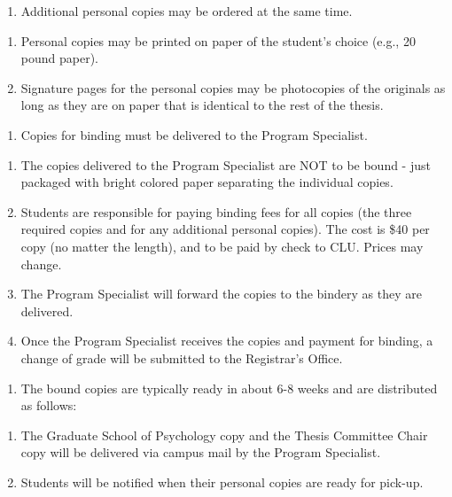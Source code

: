 \documentclass[]{book}
\providecommand{\tightlist}{%
  \setlength{\itemsep}{0pt}\setlength{\parskip}{0pt}}
\begin{document}
\begin{enumerate}
\def\labelenumi{\arabic{enumi}.}
\setcounter{enumi}{1}
\tightlist
\item
  Additional personal copies may be ordered at the same time.
\end{enumerate}

\begin{enumerate}
\def\labelenumi{\alph{enumi}.}
\tightlist
\item
  Personal copies may be printed on paper of the student's choice (e.g., 20 pound paper).
\item
  Signature pages for the personal copies may be photocopies of the originals as long as they are on paper that is identical to the rest of the thesis.
\end{enumerate}

\begin{enumerate}
\def\labelenumi{\arabic{enumi}.}
\setcounter{enumi}{2}
\tightlist
\item
  Copies for binding must be delivered to the Program Specialist.
\end{enumerate}

\begin{enumerate}
\def\labelenumi{\alph{enumi}.}
\tightlist
\item
  The copies delivered to the Program Specialist are NOT to be bound - just packaged with bright colored paper separating the individual copies.
\item
  Students are responsible for paying binding fees for all copies (the three required copies and for any additional personal copies). The cost is \$40 per copy (no matter the length), and to be paid by check to CLU. Prices may change.
\item
  The Program Specialist will forward the copies to the bindery as they are delivered.
\item
  Once the Program Specialist receives the copies and payment for binding, a change of grade will be submitted to the Registrar's Office.
\end{enumerate}

\begin{enumerate}
\def\labelenumi{\arabic{enumi}.}
\setcounter{enumi}{3}
\tightlist
\item
  The bound copies are typically ready in about 6-8 weeks and are distributed as follows:
\end{enumerate}

\begin{enumerate}
\def\labelenumi{\alph{enumi}.}
\tightlist
\item
  The Graduate School of Psychology copy and the Thesis Committee Chair copy will be delivered via campus mail by the Program Specialist.
\item
  Students will be notified when their personal copies are ready for pick-up.
\end{enumerate}
\end{document}

